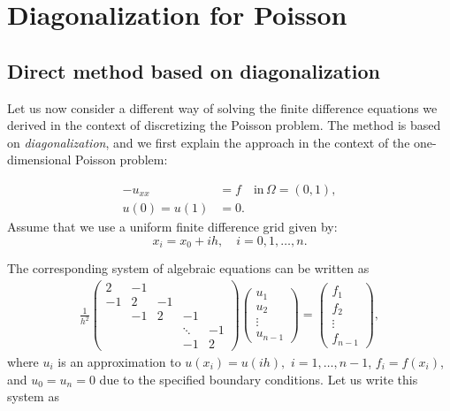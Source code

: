 \chapter{Diagonalization for Poisson}

\section{Direct method based on diagonalization}

Let us now consider a different way of solving the finite difference equations
we derived in the context of discretizing the Poisson problem. The method is
based on \emph{diagonalization}, and we first explain the approach in the context
of the one-dimensional Poisson problem:

\begin{align*}
  -u_{xx} &= f \quad \text{in}\, \Omega = (0,1), \\
  u(0) = u(1) &= 0.
\end{align*}
Assume that we use a uniform finite difference grid given by:
\begin{equation*}
  x_i = x_0 + ih, \quad i=0,1,\ldots,n.
\end{equation*}

The corresponding system of algebraic equations can be written as
\begin{align*}
  \frac{1}{h^2}
  \begin{pmatrix}
    2 & -1 & & & \\
    -1 & 2 & -1 & & \\
    & -1 & 2 & -1 & \\
    & & & \ddots & -1 \\
    & & & -1 & 2
  \end{pmatrix}
  \begin{pmatrix}
    u_1 \\
    u_2 \\
    \vdots \\
    u_{n-1}
  \end{pmatrix}
  =
  \begin{pmatrix}
    f_1 \\
    f_2 \\
    \vdots \\
    f_{n-1}
  \end{pmatrix},
\end{align*}
where $u_i$ is an approximation to $u(x_i) = u(ih),$ $i=1,\ldots,n-1$,
$f_i=f(x_i)$, and $u_0 = u_n = 0$ due to the specified boundary conditions. Let us write this system as

